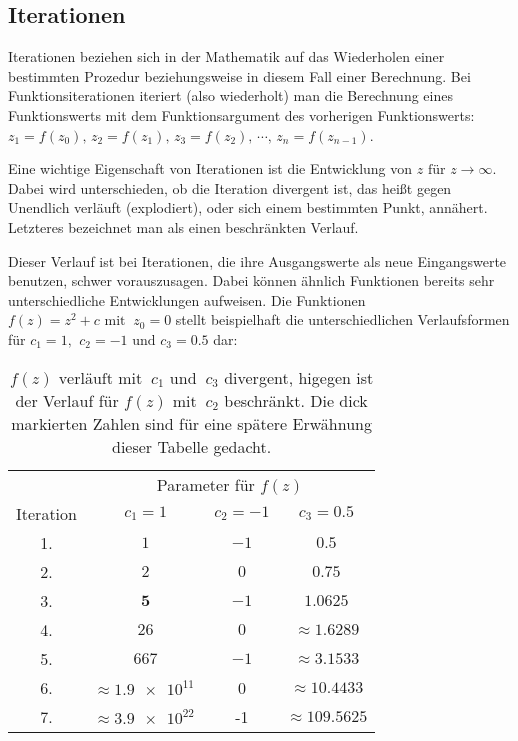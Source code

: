 \subsection{Iterationen}\label{subsec:iterations}

Iterationen beziehen sich in der Mathematik auf das Wiederholen einer bestimmten
Prozedur beziehungsweise in diesem Fall einer Berechnung.
Bei Funktionsiterationen iteriert (also wiederholt) man die Berechnung eines
Funktionswerts mit dem Funktionsargument des vorherigen Funktionswerts:
$z_1 = f(z_0),\, z_2 = f(z_1),\, z_3 = f(z_2),\, \cdots,\, z_n = f(z_{n-1})$.

Eine wichtige Eigenschaft von Iterationen ist die Entwicklung von
$z \text{ für } z \to \infty$.
Dabei wird unterschieden, ob die Iteration divergent ist,
das heißt gegen Unendlich verl\"auft (\glqq explodiert\grqq),
oder sich einem bestimmten Punkt, ann\"ahert.
Letzteres bezeichnet man als einen beschränkten Verlauf.

Dieser Verlauf ist bei Iterationen, die ihre Ausgangswerte als neue Eingangswerte
benutzen, schwer vorauszusagen.
Dabei k\"onnen \"ahnlich Funktionen bereits sehr unterschiedliche Entwicklungen aufweisen.
Die Funktionen $f(z) = z^2 + c \text{ mit }\ z_0 = 0$ stellt beispielhaft
die unterschiedlichen Verlaufsformen für
$c_1 = 1 \text{, }\ c_2 = -1 \text{ und } c_3 = 0.5$ dar:

\begin{table}[h!]\label{tab:iterations-example}
  \centering
  \begin{tabular}{@{}cccc@{}}
    \toprule
    & \multicolumn{3}{c}{Parameter für $f(z)$} \\
    \cmidrule(lr){2-4}
    Iteration & $ c_1 = 1$ & $ c_2 = -1$ & $ c_3 = 0.5$ \\
    \midrule
    1. & $1$ & $-1$ & $0.5$ \\
    2. & $2$ & $0$ & $0.75$ \\
    3. & $\boldsymbol{5}$ & $-1$ & $1.0625$ \\
    4. & $26$ & $0$ & $\approx 1.6289 $ \\
    5. & $667$ & $-1$ & $\approx \boldsymbol{3.1533} $ \\
    6. & $\approx \num{1,9e11}\ $ & 0 & $\approx 10.4433 $ \\
    7. & $\approx \num{3,9e22}\ $ & -1 & $\approx 109.5625 $ \\
    \bottomrule
  \end{tabular}
  \caption{
    $f(z) \text{ verl\"auft mit }\ c_1 \text{ und }\ c_3$ divergent,
    higegen ist der Verlauf f\"ur $f(z) \text{ mit }\ c_2$ beschr\"ankt.
    Die dick markierten Zahlen sind für eine spätere Erwähnung dieser Tabelle
    gedacht.
  }
\end{table}